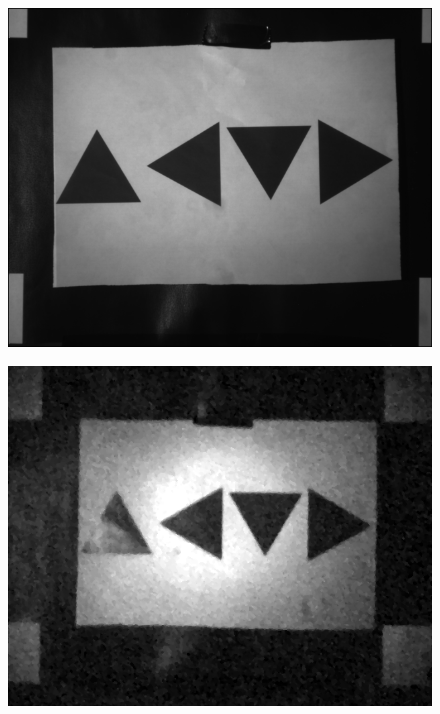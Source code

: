 \begin{figure}[H]
    \centering
\begin{minipage}[t]{0.40\textwidth}
    \includegraphics[width=1\textwidth]{result/mtf/swir2.png}
    \subcaption{}
    \label{fig:mtf_s2}
\end{minipage}
\begin{minipage}[t]{0.40\textwidth}
    \includegraphics[width=1\textwidth]{result/mtf/spc22.png}
    \subcaption{}
    \label{fig:mtf_spc2}
\end{minipage}
\begin{minipage}[t]{0.40\textwidth}

\end{minipage}
\end{figure}
